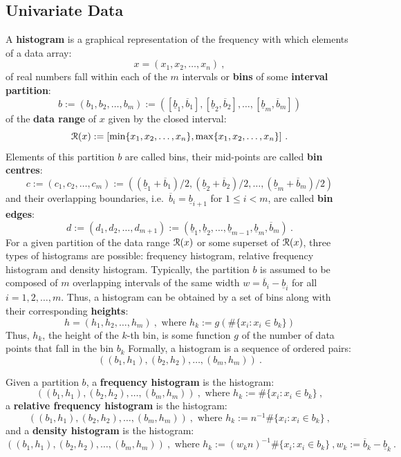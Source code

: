 \subsection{Univariate Data}
A {\bf histogram} is a graphical representation of the frequency with which elements of a data array:
$$x = (x_1,x_2,\ldots,x_n) \ ,$$ 
of real numbers fall within each of the $m$ intervals or {\bf bins} of some {\bf interval partition}:
$$b := ( b_1, b_2, \ldots, b_m ) := ( [\underline{b}_1,\overline{b}_1], [\underline{b}_2,\overline{b}_2], \ldots, [\underline{b}_m,\overline{b}_m] )$$
of the {\bf data range} of $x$ given by the closed interval: 
$$\C{R}(x) := [\min \{x_1,x_2,\ldots,x_n \}, \max \{x_1,x_2,\ldots,x_n \}] \ .$$  
Elements of this partition $b$ are called bins, their mid-points are called {\bf bin centres}:
$$c := ( c_1, c_2, \ldots, c_m ) := ( (\underline{b}_1+\overline{b}_1)/2, (\underline{b}_2 + \overline{b}_2)/2, \ldots, (\underline{b}_m + \overline{b}_m)/2 )$$
and their overlapping boundaries, i.e.~$\overline{b}_i=\underline{b}_{i+1}$ for $1 \leq i < m$, are called {\bf bin edges}:
$$d := (d_1,d_2,\ldots,d_{m+1}) := (\underline{b}_1, \underline{b}_2, \ldots, \underline{b}_{m-1}, \underline{b}_m, \overline{b}_m) \ .$$ 
For a given partition of the data range $\mathcal{R}(x)$ or some superset of $\mathcal{R}(x)$, three types of histograms are possible: frequency histogram, relative frequency histogram and density histogram.  Typically, the partition $b$ is assumed to be composed of $m$ overlapping intervals of the same width $w=\overline{b}_i - \underline{b}_i$ for all $i=1,2,\ldots,m$.  Thus, a histogram can be obtained by a set of bins along with their corresponding {\bf heights}:
$$h = (h_1,h_2,\ldots,h_m) \ , \text{ where } h_k := g(\# \{x_i : x_i \in b_k\} )$$
Thus, $h_k$, the height of the $k$-th bin, is some function $g$ of the number of data points that fall in the bin $b_k$ Formally, a histogram is a sequence of ordered pairs:
$$\left(  (b_1,h_1), (b_2,h_2), \ldots, (b_m,h_m) \right) \ .$$

Given a partition $b$, a {\bf frequency histogram} is the histogram:
$$\left(  (b_1,h_1), (b_2,h_2), \ldots, (b_m,h_m) \right) \ , \text{ where } h_k := \# \{x_i : x_i \in b_k\} \ ,$$
a {\bf relative frequency histogram} is the histogram:
$$\left(  (b_1,h_1), (b_2,h_2), \ldots, (b_m,h_m) \right) \ , \text{ where } h_k := n^{-1} \# \{x_i : x_i \in b_k\} \ ,$$
and a {\bf density histogram} is the histogram:
$$\left(  (b_1,h_1), (b_2,h_2), \ldots, (b_m,h_m) \right) \ , \text{ where } h_k := (w_k n)^{-1} \# \{x_i : x_i \in b_k\} \ , w_k := \overline{b}_k - \underline{b}_k \ .$$
  
